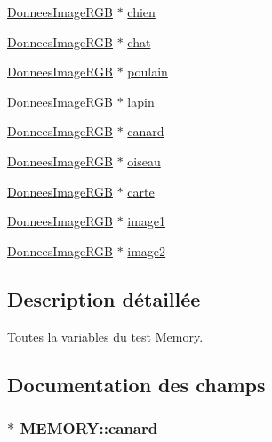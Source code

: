 \begin{DoxyCompactItemize}
\hyperlink{struct_donnees_image_r_g_b}{Donnees\+Image\+R\+GB} $\ast$ \hyperlink{struct_m_e_m_o_r_y_a32e76e57e2b432423f14ee09fc1a79a4}{chien}
\item 
\hyperlink{struct_donnees_image_r_g_b}{Donnees\+Image\+R\+GB} $\ast$ \hyperlink{struct_m_e_m_o_r_y_a28103ceb9dd68176288dee637c68c5f0}{chat}
\item 
\hyperlink{struct_donnees_image_r_g_b}{Donnees\+Image\+R\+GB} $\ast$ \hyperlink{struct_m_e_m_o_r_y_a2063d0194041416f4a590b59e82dcf68}{poulain}
\item 
\hyperlink{struct_donnees_image_r_g_b}{Donnees\+Image\+R\+GB} $\ast$ \hyperlink{struct_m_e_m_o_r_y_a9488bca8d0234a8f1556dbd718dcdd81}{lapin}
\item 
\hyperlink{struct_donnees_image_r_g_b}{Donnees\+Image\+R\+GB} $\ast$ \hyperlink{struct_m_e_m_o_r_y_aab6f610a1d97c04874482adf77abeb9f}{canard}
\item 
\hyperlink{struct_donnees_image_r_g_b}{Donnees\+Image\+R\+GB} $\ast$ \hyperlink{struct_m_e_m_o_r_y_a05a37774d5e49267638f976a5b353c18}{oiseau}
\item 
\hyperlink{struct_donnees_image_r_g_b}{Donnees\+Image\+R\+GB} $\ast$ \hyperlink{struct_m_e_m_o_r_y_af1df7e7366b85bfb51eeb061faf2192d}{carte}
\item 
\hyperlink{struct_donnees_image_r_g_b}{Donnees\+Image\+R\+GB} $\ast$ \hyperlink{struct_m_e_m_o_r_y_a27674a4ccf8988528ce4841b509927c9}{image1}
\item 
\hyperlink{struct_donnees_image_r_g_b}{Donnees\+Image\+R\+GB} $\ast$ \hyperlink{struct_m_e_m_o_r_y_af357974c35da4eeeb0d20c1d6ef0574d}{image2}
\end{DoxyCompactItemize}


\subsection{Description détaillée}
Toutes la variables du test Memory. 

\subsection{Documentation des champs}
\subsubsection[{\texorpdfstring{canard}{canard}}]{ $\ast$ M\+E\+M\+O\+R\+Y\+::canard}\hypertarget{struct_m_e_m_o_r_y_aab6f610a1d97c04874482adf77abeb9f}{}\label{struct_m_e_m_o_r_y_aab6f610a1d97c04874482adf77abeb9f}

